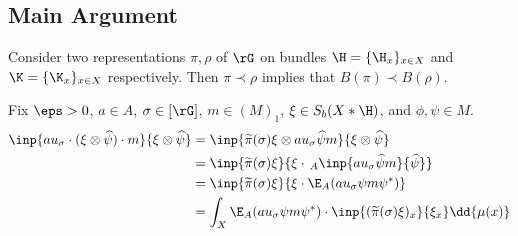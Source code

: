 \documentclass[12pt]{article}
\begin{document}
\subsection{Main Argument}

\begin{proposition}
    Consider two representations $ \pi, \rho$ of $ \rG $ on bundles $ \H = \{\H_{x}\}_{x\in X} $ and $ \K = \{\K_{x}\}_{x\in X} $ respectively. Then $ \pi \prec \rho $ implies that $ B(\pi) \prec B( \rho) $.
\end{proposition}







Fix $ \eps>0 $, $ a\in A $, $ \sigma\in [\rG] $, $ m\in (M)_{1} $, $ \xi\in S_{b}(X\ast \H) $, and $ \phi, \psi\in M $.
\begin{align*}
    \inp{au_{\sigma}\cdot ( \xi \otimes \widehat{\psi}) \cdot m}{ \xi \otimes  \widehat{\psi}} &= \inp{\widetilde{\pi}(\sigma) \xi \otimes  au_{\sigma} \widehat{\psi} m}{ \xi \otimes \widehat{\psi}}\\
    &= \inp{\widetilde{\pi}(\sigma) \xi}{ \xi \cdot\, _A \inp{au_{\sigma} \widehat{\psi}m}{\widehat{\psi}}}\\
    &= \inp{\widetilde{\pi}(\sigma) \xi}{ \xi \cdot\E_{A}(au_{\sigma} \psi m\psi^{*})}\\
    &= \int_{X}\E_{A}(au_{\sigma} \psi m\psi^{*}) \cdot \inp{(\widetilde{\pi}(\sigma) \xi)_{x}}{\xi_{x}}\dd{\mu(x)}
\end{align*}
\end{document}
